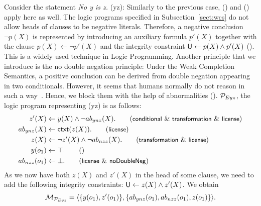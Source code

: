 \documentclass[12pt]{article}
\begin{document}
Consider the statement \textit{No y is z.} ({\ME yz}):
Similarly to the previous case, (\licenses) and () apply here
as well.
The logic programs specified in Subsection~\ref{sect:wcs} 
do not allow heads of clauses to be negative literals. Therefore, a negative conclusion~$\neg p(X)$ is represented
by introducing an auxiliary formula $p'(X)$ together with the clause $p(X) \leftarrow \neg p'(X)$ and the integrity constraint $\mathsf{U} \leftarrow p(X) \wedge p'(X)$ (\transformation). This is a widely used technique in Logic Programming. 
Another principle that we introduce is the no double negation principle: Under the Weak Completion Semantics, a positive conclusion can be derived from double negation appearing in two conditionals. However, it seems that humans normally do not reason in such a way~\cite{khemlani:2012}. Hence, we block them with the help of abnormalities (\dnegation). ${\cal P}_{Eyz}$, the logic program representing (\ME yz) is as follows:
\begin{align}
 z'(X) & \leftarrow y(X) \wedge \neg \Ab_{ynz}(X).  \tag{\conditionals\ \&\ \transformation\ \&\  \licenses} \\
\Ab_{ynz}(X)  & \leftarrow \cxt(z(X)).\tag{\licenses} \\
z(X) & \leftarrow \neg z'(X) \wedge \neg \Ab_{nzz}(X). \tag{\transformation\ \&\ \licenses} \\
y(o_1) & \leftarrow \top. \tag{} \\
\Ab_{nzz}(o_1) & \leftarrow \bot. \tag{\licenses\ \&\  \dnegation}
\end{align}
As we now have both $z(X)$ and $z'(X)$ in the head of some clause, we need to add the 
following integrity constraints: $\mathsf{U} \leftarrow z(X) \wedge
z'(X)$. We obtain 
\[{\cal M}_{{\cal P}_{Eyz}} = \langle \{y(o_1), z'(o_1)\},\{ab_{ynz}(o_1), ab_{nzz}(o_1),  z(o_1)\}
\rangle.
\]
\end{document}
